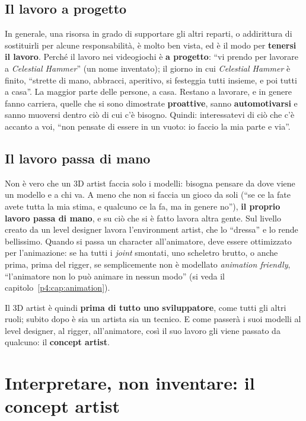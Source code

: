 \subsection{Il lavoro a progetto}

In generale, una risorsa in grado di supportare gli altri reparti, o addirittura
di sostituirli per alcune responsabilità, è molto ben vista, ed è il modo per
\textbf{tenersi il lavoro}. Perché il lavoro nei videogiochi è \textbf{a
progetto}: ``vi prendo per lavorare a \emph{Celestial Hammer}'' (un nome
inventato); il giorno in cui \emph{Celestial Hammer} è finito, ``strette di
mano, abbracci, aperitivo, si festeggia tutti insieme, e poi tutti a casa''. La
maggior parte delle persone, a casa. Restano a lavorare, e in genere fanno
carriera, quelle che si sono dimostrate \textbf{proattive}, sanno
\textbf{automotivarsi} e sanno muoversi dentro ciò di cui c'è bisogno. Quindi:
interessatevi di ciò che c'è accanto a voi, ``non pensate di essere in un vuoto:
io faccio la mia parte e via''.

\subsection{Il lavoro passa di mano}

Non è vero che un 3D artist faccia solo i modelli: bisogna pensare da dove
viene un modello e a chi va. A meno che non si faccia un gioco da soli (``se ce
la fate avete tutta la mia stima, e qualcuno ce la fa, ma in genere no''),
\textbf{il proprio lavoro passa di mano}, e su ciò che si è fatto lavora altra
gente. Sul livello creato da un level designer lavora l'environment artist, che
lo ``dressa'' e lo rende bellissimo. Quando si passa un character
all'animatore, deve essere ottimizzato per l'animazione: se ha tutti i
\emph{joint} smontati, uno scheletro brutto, o anche prima, prima del rigger,
se semplicemente non è modellato \emph{animation friendly}, ``l'animatore non
lo può animare in nessun modo'' (si veda il capitolo~\ref{p4:cap:animation}).

Il 3D artist è quindi \textbf{prima di tutto uno sviluppatore}, come tutti gli
altri ruoli; subito dopo è sia un artista sia un tecnico. E come passerà i suoi
modelli al level designer, al rigger, all'animatore, così il suo lavoro gli
viene passato da qualcuno: il \textbf{concept artist}.

\section{Interpretare, non inventare: il concept artist}
\label{p6:sec:concept}

